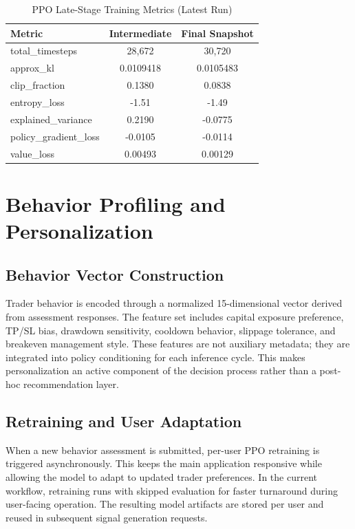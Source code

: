 \begin{table}[h]
\centering
\caption{PPO Late-Stage Training Metrics (Latest Run)}
\begin{tabular}{|l|c|c|}
\hline
\textbf{Metric} & \textbf{Intermediate} & \textbf{Final Snapshot} \\
\hline
total\_timesteps & 28,672 & 30,720 \\
approx\_kl & 0.0109418 & 0.0105483 \\
clip\_fraction & 0.1380 & 0.0838 \\
entropy\_loss & -1.51 & -1.49 \\
explained\_variance & 0.2190 & -0.0775 \\
policy\_gradient\_loss & -0.0105 & -0.0114 \\
value\_loss & 0.00493 & 0.00129 \\
\hline
\end{tabular}
\end{table}

\section{Behavior Profiling and Personalization}

\subsection{Behavior Vector Construction}

Trader behavior is encoded through a normalized 15-dimensional vector derived from assessment responses. The feature set includes capital exposure preference, TP/SL bias, drawdown sensitivity, cooldown behavior, slippage tolerance, and breakeven management style. These features are not auxiliary metadata; they are integrated into policy conditioning for each inference cycle. This makes personalization an active component of the decision process rather than a post-hoc recommendation layer.

\subsection{Retraining and User Adaptation}

When a new behavior assessment is submitted, per-user PPO retraining is triggered asynchronously. This keeps the main application responsive while allowing the model to adapt to updated trader preferences. In the current workflow, retraining runs with skipped evaluation for faster turnaround during user-facing operation. The resulting model artifacts are stored per user and reused in subsequent signal generation requests.

